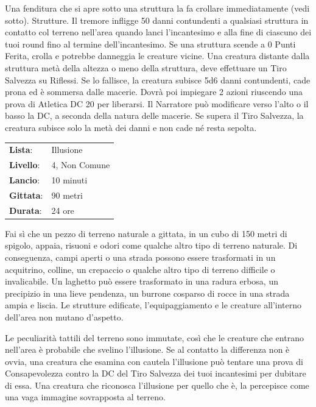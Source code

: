 \begin{multicols}{2}
Una fenditura che si apre sotto una struttura la fa crollare immediatamente (vedi sotto). Strutture. Il tremore infligge 50 danni contundenti a qualsiasi struttura in contatto col terreno nell'area quando lanci l'incantesimo e alla fine di ciascuno dei tuoi round fino al termine dell'incantesimo. Se una struttura scende a 0 Punti Ferita, crolla e potrebbe danneggia le creature vicine. Una creatura distante dalla struttura metà della altezza o meno della struttura, deve effettuare un Tiro Salvezza su Riflessi. Se lo fallisce, la creatura subisce 5d6 danni contundenti, cade prona ed è sommersa dalle macerie. Dovrà poi impiegare 2 azioni riuscendo una prova di Atletica DC 20 per liberarsi. Il Narratore può modificare verso l'alto o il basso la DC, a seconda della natura delle macerie. Se supera il Tiro Salvezza, la creatura subisce solo la metà dei danni e non cade né resta sepolta.

\noindent\begin{tabularx}{\linewidth}{p{1.3cm}X}
	\rowcolor{gray!20}\textbf{Lista}: & Illusione \\
	\textbf{Livello}: & 4, Non Comune \\
	\rowcolor{gray!20}\textbf{Lancio}: & 10 minuti \\
	\textbf{Gittata}: & 90 metri \\
	\rowcolor{gray!20}\textbf{Durata}: & 24 ore \\
\end{tabularx}\smallskip

Fai sì che un pezzo di terreno naturale a gittata, in un cubo di 150 metri di spigolo, appaia, risuoni e odori come qualche altro tipo di terreno naturale. Di conseguenza, campi aperti o una strada possono essere trasformati in un acquitrino, colline, un crepaccio o qualche altro tipo di terreno difficile o invalicabile. Un laghetto può essere trasformato in una radura erbosa, un precipizio in una lieve pendenza, un burrone cosparso di rocce in una strada ampia e liscia. Le strutture edificate, l'equipaggiamento e le creature all'interno dell'area non mutano d'aspetto.

Le peculiarità tattili del terreno sono immutate, così che le creature che entrano nell'area è probabile che svelino l'illusione. Se al contatto la differenza non è ovvia, una creatura che esamina con cautela l'illusione può tentare una prova di Consapevolezza contro la DC del Tiro Salvezza dei tuoi incantesimi per dubitare di essa. Una creatura che riconosca l'illusione per quello che è, la percepisce come una vaga immagine sovrapposta al terreno.


\end{multicols}
